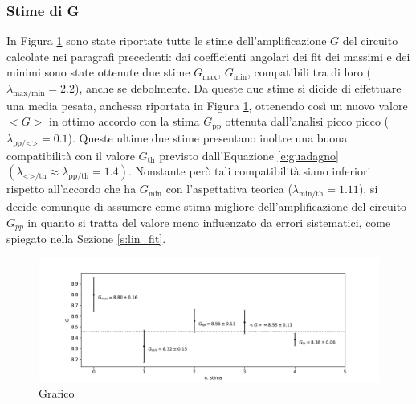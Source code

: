 \documentclass[a4paper,11pt]{article}
\begin{document}
\subsubsection{Stime di G}
In Figura \ref{fig:all} sono state riportate tutte le stime dell'amplificazione $G$ del circuito calcolate nei paragrafi precedenti: dai coefficienti angolari dei fit dei massimi e dei
minimi sono state ottenute due stime $G_{\text{max}}$, $G_{\text{min}}$, compatibili tra di loro
($\lambda_{\text{max/min}}=2.2$), anche se debolmente. Da queste due stime si dicide di effettuare una media pesata, anchessa riportata in Figura \ref{fig:all}, ottenendo così un nuovo valore $<G>$ in ottimo accordo con la stima $G_{\text{pp}}$ ottenuta dall'analisi picco picco ($\lambda_{\text{pp/<>}}=0.1$). Queste ultime due stime presentano
inoltre una buona compatibilità con il valore $G_{\text{th}}$ previsto dall'Equazione \ref{e:guadagno}
$(\lambda_{\text{<>/th}} \approx \lambda_{\text{pp/th}} = 1.4)$.
Nonstante però tali compatibilità siano inferiori rispetto all'accordo che ha $G_{\text{min}}$ con l'aspettativa teorica ($\lambda_{\text{min/th}}=1.11$), si decide comunque di assumere come stima migliore dell'amplificazione
del circuito $G_{pp}$ in quanto si tratta del valore meno influenzato da errori sistematici, come spiegato nella Sezione \ref{s:lin_fit}.
\begin{figure}[h]
\centering
\includegraphics[width=1.1\textwidth]{images/grafico_all}
\caption{\footnotesize Grafico}\label{fig:all}
\end{figure}
\end{document}
